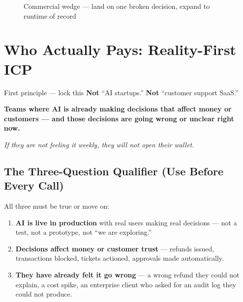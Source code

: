 \begin{figure}[H]
\centering
{}
\caption{Commercial wedge --- land on one broken decision, expand to runtime of record}
\label{fig:commercial-wedge}
\end{figure}

\section{Who Actually Pays: Reality-First ICP}

\begin{conceptbox}{First principle --- lock this}
\centering
\textbf{Not} ``AI startups.'' \textbf{Not} ``customer support SaaS.''

\smallskip
\textbf{Teams where AI is already making decisions that affect money or customers
--- and those decisions are going wrong or unclear right now.}

\smallskip
\textit{If they are not feeling it weekly, they will not open their wallet.}
\end{conceptbox}

\subsection{The Three-Question Qualifier (Use Before Every Call)}

All three must be true or move on:

\begin{enumerate}[leftmargin=1.8em, itemsep=3pt]
  \item \textbf{AI is live in production} with real users making real decisions ---
    not a test, not a prototype, not ``we are exploring.''
  \item \textbf{Decisions affect money or customer trust} --- refunds issued,
    transactions blocked, tickets actioned, approvals made automatically.
  \item \textbf{They have already felt it go wrong} --- a wrong refund they
    could not explain, a cost spike, an enterprise client who asked for an
    audit log they could not produce.
\end{enumerate}

